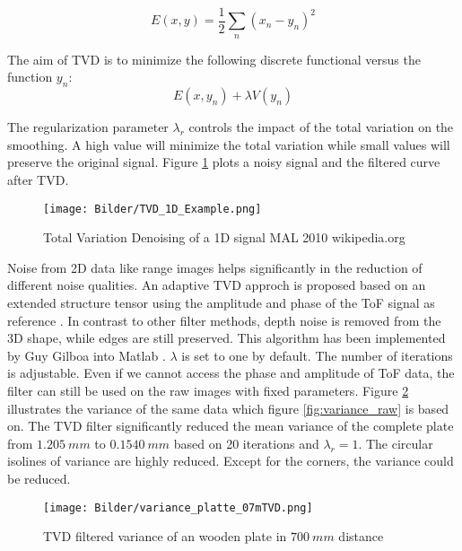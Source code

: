 \begin{equation}
E(x,y)=\frac{1}{2}\sum_{n} (x_n - y_n)^2
\end{equation}

The aim of TVD is to minimize the following discrete functional versus the function $y_n$:
\begin{equation}
E(x,y_n)  + \lambda V(y_n)
\end{equation}

The regularization parameter $\lambda_r$ controls the impact of the total variation on the smoothing. A high value will minimize the total variation while small values will preserve the original signal. Figure \ref{fig:TVD_1D} plots a noisy signal and the filtered curve after TVD.

\begin{figure}[!h]
	\centering
	\texttt{[image: Bilder/TVD\_1D\_Example.png]}
	\caption{Total Variation Denoising of a 1D signal \tiny MAL 2010 wikipedia.org \ccbysa}
	\label{fig:TVD_1D}
\end{figure}

Noise from 2D data like range images helps significantly in the reduction of different noise qualities. An adaptive TVD approch is proposed based on an extended structure tensor using the amplitude and phase of the ToF signal as reference \cite{lenzen2011denoising}. In contrast to other filter methods, depth noise is removed from the 3D shape, while edges are still preserved. This algorithm has been implemented by Guy Gilboa into Matlab \cite{TVD_Matlab_code}. $\lambda$ is set to one by default. The number of iterations is adjustable. Even if we cannot access the phase and amplitude of ToF data, the filter can still be used on the raw images with fixed parameters. Figure \ref{fig:variance_TVD} illustrates the variance of the same data which figure \ref{fig:variance_raw} is based on. The TVD filter significantly reduced the mean variance of the complete plate from $1.205~mm$ to $0.1540~mm$ based on 20 iterations and $\lambda_r =1$. The circular isolines of variance are highly reduced. Except for the corners, the variance could be reduced.

\begin{figure}[!h]
	\centering
	\texttt{[image: Bilder/variance\_platte\_07mTVD.png]}
	\caption{TVD filtered variance of an wooden plate in $700~mm$ distance}
	\label{fig:variance_TVD}
\end{figure}

\newpage
